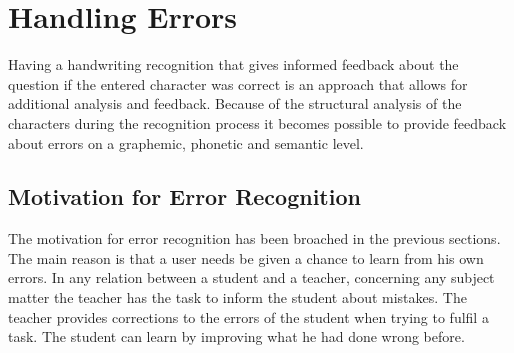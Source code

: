 

\section{Handling Errors}
\label{sec:concept:handlingerrors}

Having a handwriting recognition that gives informed feedback about the 
question if the entered character was correct is an approach that allows
for additional analysis and feedback.
Because of the structural analysis of the characters during the recognition 
process it becomes possible to provide feedback about errors on a graphemic, 
phonetic and semantic level.



\subsection{Motivation for Error Recognition}
\label{sec:concept:motivationforerrorrecognition}

The motivation for error recognition has been broached in the previous sections.
The main reason is that a user needs be given a chance to learn from his own 
errors. In any relation between a student and a teacher, concerning any subject 
matter the teacher has the task to inform the student about mistakes.
The teacher provides corrections to the errors of the student when trying
to fulfil a task. The student can learn by improving what he had done wrong 
before. 

